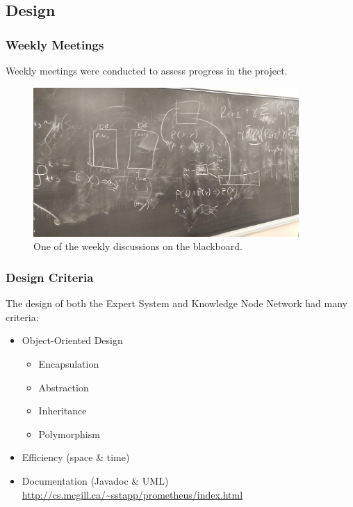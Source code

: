 \documentclass{beamer}
\begin{document}
	\subsection{Design}
	
	\begin{frame}
		\frametitle{Weekly Meetings}
		Weekly meetings were conducted to assess progress in the project.
		\begin{figure}
			\centering
			\includegraphics[width=0.9\textwidth]{figures/meeting.jpg}
			\caption
			{One of the weekly discussions on the blackboard.}
			\label{fig:meeting}
		\end{figure}
	\end{frame}
	
	\begin{frame}
		\frametitle{Design Criteria}
		The design of both the Expert System and Knowledge Node Network had many criteria:
		\begin{itemize}
			\item Object-Oriented Design
					\begin{itemize}
						\item Encapsulation
						\item Abstraction
						\item Inheritance
						\item Polymorphism
					\end{itemize}
			\item Efficiency (space \& time)
			\item Documentation (Javadoc \& UML) \url{http://cs.mcgill.ca/~sstapp/prometheus/index.html}
		\end{itemize}
	\end{frame}
\end{document}
